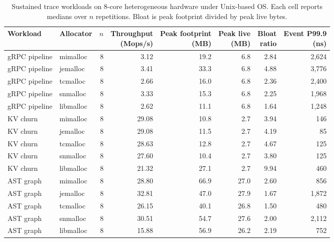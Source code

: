 \begin{table}[!htbp]
\centering
\scriptsize
\setlength{\tabcolsep}{3pt}
\caption{Sustained trace workloads on 8-core heterogeneous hardware under Unix-based OS. Each cell reports medians over $n$ repetitions. Bloat is peak footprint divided by peak live bytes.}
\label{tab:trace}
\begin{tabular}{llrrrrrr}
\toprule
Workload & Allocator & $n$ & \shortstack{Throughput\\(Mops/s)} & \shortstack{Peak footprint\\(MB)} & \shortstack{Peak live\\(MB)} & \shortstack{Bloat\\ratio} & \shortstack{Event P99.9\\(ns)}\\
\midrule
gRPC pipeline & mimalloc & 8 & 3.12 & 19.2 & 6.8 & 2.84 & 2{,}624 \\
gRPC pipeline & jemalloc & 8 & 3.41 & 33.3 & 6.8 & 4.88 & 3{,}776 \\
gRPC pipeline & tcmalloc & 8 & 2.66 & 16.0 & 6.8 & 2.36 & 2{,}400 \\
gRPC pipeline & snmalloc & 8 & 3.33 & 15.3 & 6.8 & 2.25 & 1{,}968 \\
gRPC pipeline & libmalloc & 8 & 2.62 & 11.1 & 6.8 & 1.64 & 1{,}248 \\
KV churn & mimalloc & 8 & 29.08 & 10.8 & 2.7 & 3.94 & 146 \\
KV churn & jemalloc & 8 & 29.08 & 11.5 & 2.7 & 4.19 & 85 \\
KV churn & tcmalloc & 8 & 28.63 & 12.8 & 2.7 & 4.67 & 125 \\
KV churn & snmalloc & 8 & 27.60 & 10.4 & 2.7 & 3.80 & 125 \\
KV churn & libmalloc & 8 & 21.32 & 27.1 & 2.7 & 9.94 & 460 \\
AST graph & mimalloc & 8 & 28.80 & 66.9 & 27.0 & 2.60 & 856 \\
AST graph & jemalloc & 8 & 32.81 & 47.0 & 27.9 & 1.67 & 1{,}872 \\
AST graph & tcmalloc & 8 & 26.15 & 40.1 & 26.8 & 1.50 & 480 \\
AST graph & snmalloc & 8 & 30.51 & 54.7 & 27.6 & 2.00 & 2{,}112 \\
AST graph & libmalloc & 8 & 15.88 & 56.9 & 26.2 & 2.19 & 752 \\
\bottomrule
\end{tabular}
\end{table}
